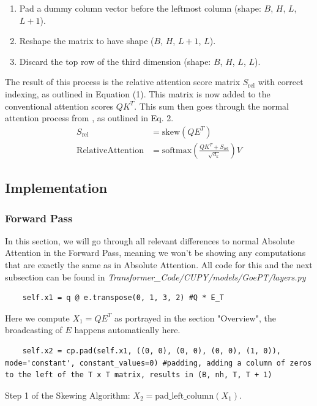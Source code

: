 \documentclass[a4paper,12pt]{extarticle}
\begin{document}
\begin{enumerate}
\item Pad a dummy column vector before the leftmost column (shape: $B$, $H$, $L$, $L + 1$).
\item Reshape the matrix to have shape ($B$, $H$, $L + 1$, $L$).
\item Discard the top row of the third dimension (shape: $B$, $H$, $L$, $L$).
\end{enumerate}

The result of this process is the relative attention score matrix $S_\text{rel}$ with correct indexing, as outlined in Equation (1). This matrix is now added to the conventional attention scores $QK^T$. This sum then goes through the normal attention process from \textcite{DBLP:journals/corr/VaswaniSPUJGKP17}, as outlined in Eq. 2.\vspace{0.15cm}
\begin{align}
S_{\text{rel}} &= \text{skew}(QE^T) \\[0.2cm] 
\text{RelativeAttention} &=
\text{softmax}\left(\frac{QK^T+S_\text{rel}}{\sqrt{d_k}}\right)V
\end{align}

\subsection{Implementation}
\subsubsection{Forward Pass}
In this section, we will go through all relevant differences to normal Absolute Attention in the Forward Pass, meaning we won't be showing any computations that are exactly the same as in Absolute Attention. All code for this and the next subsection can be found in \textit{Transformer\_Code/CUPY/models/GoePT/layers.py}\newline
\begin{lstlisting}
    self.x1 = q @ e.transpose(0, 1, 3, 2) #Q * E_T
\end{lstlisting}
Here we compute $X_1 = QE^T$ as portrayed in the section "Overview", the broadcasting of $E$ happens automatically here.\newline
\begin{lstlisting}
    self.x2 = cp.pad(self.x1, ((0, 0), (0, 0), (0, 0), (1, 0)), mode='constant', constant_values=0) #padding, adding a column of zeros to the left of the T x T matrix, results in (B, nh, T, T + 1)
\end{lstlisting}
Step 1 of the Skewing Algorithm: \( X_2 = \text{pad\_left\_column}(X_1) \).\newline
\end{document}

